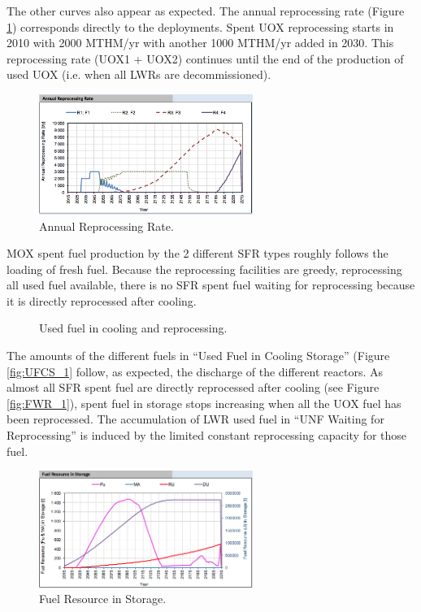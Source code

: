 \documentclass[12pt]{article}
\begin{document}
The other curves also appear as expected. The annual reprocessing rate (Figure
\ref{fig:reprocessing_1}) corresponds directly to the deployments. Spent UOX
reprocessing starts in 2010 with 2000 MTHM/yr with another 1000 MTHM/yr added in
2030. This reprocessing rate (UOX1 + UOX2) continues until the end of the
production of used UOX (i.e. when all LWRs are decommissioned).

\begin{figure}[h!]
    \centering
    \includegraphics[width=0.62\textwidth]  {img/AnnualReprocessingRate_1}
    \caption{Annual Reprocessing Rate.}
    \label{fig:reprocessing_1}
\end{figure}


MOX spent fuel production by the 2 different SFR types roughly follows the
loading of fresh fuel.  Because the reprocessing facilities are greedy,
reprocessing all used fuel available, there is no SFR spent fuel waiting for reprocessing
because it is directly reprocessed after cooling.

\begin{figure}[h!]
    \centering
    \caption{Used fuel in cooling and reprocessing.\label{fig:cool_reprocc} }
\end{figure}
The amounts of the different fuels in ``Used Fuel in Cooling Storage'' (Figure
\ref{fig:UFCS_1} follow, as expected, the discharge of the different reactors.
As almost all SFR spent fuel are directly reprocessed after cooling (see Figure
\ref{fig:FWR_1}), spent fuel in storage stops increasing when all the UOX fuel has
been reprocessed. The accumulation of LWR used fuel in ``UNF Waiting for
Reprocessing'' is induced by the limited constant reprocessing capacity for those
fuel. 

\begin{figure}[h!]
    \centering
    \includegraphics[width=0.62\textwidth]{img/FuelInStorage_1}
    \caption{Fuel Resource in Storage.}
    \label{fig:storagecompo_1}
\end{figure}
\end{document}
